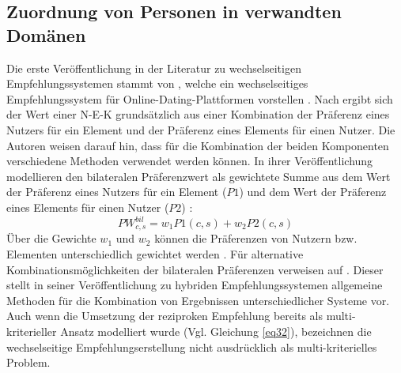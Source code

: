 \subsection{Zuordnung von Personen in verwandten Domänen}
\label{ch:verwandte_arbeiten:1:1}
Die erste Veröffentlichung in der Literatur zu wechselseitigen Empfehlungssystemen stammt von \textcite[S. 1ff.]{pizzato:inproceedings}, welche ein wechselseitiges Empfehlungssystem für Online-Dating-Plattformen vorstellen \cite[S. 1469]{yildirim:article}.
Nach \textcite[S. 5]{pizzato:inproceedings} ergibt sich der Wert einer \ac{N-E-K} grundsätzlich aus einer Kombination der Präferenz eines Nutzers für ein Element und der Präferenz eines Elements für einen Nutzer.
Die Autoren weisen darauf hin, dass für die Kombination der beiden Komponenten verschiedene Methoden verwendet werden können.
In ihrer Veröffentlichung modellieren \textcite[S. 6]{pizzato:inproceedings} den bilateralen Präferenzwert als gewichtete Summe aus dem Wert der Präferenz eines Nutzers für ein Element ($P1$) und dem Wert der Präferenz eines Elements für einen Nutzer ($P2$) \cite[S. 6]{pizzato:inproceedings}:
\begin{equation}\label{eq32}
    PW_{c,s}^{bil} = w_{1}P1(c,s) + w_{2}P2(c,s)
\end{equation}
Über die Gewichte $w_{1}$ und $w_{2}$ können die Präferenzen von Nutzern bzw. Elementen unterschiedlich gewichtet werden \cite[S. 6]{pizzato:inproceedings}.
Für alternative Kombinationsmöglichkeiten der bilateralen Präferenzen verweisen \textcite[S. 5]{pizzato:inproceedings} auf \textcite[S. 339ff.]{burke:article}.
Dieser stellt in seiner Veröffentlichung zu hybriden Empfehlungssystemen allgemeine Methoden für die Kombination von Ergebnissen unterschiedlicher Systeme vor.
Auch wenn die Umsetzung der reziproken Empfehlung bereits als multi-kriterieller Ansatz modelliert wurde (Vgl. Gleichung \ref{eq32}), bezeichnen \textcite[S. 1ff.]{pizzato:inproceedings} die wechselseitige Empfehlungserstellung nicht ausdrücklich als multi-kriterielles Problem. 

